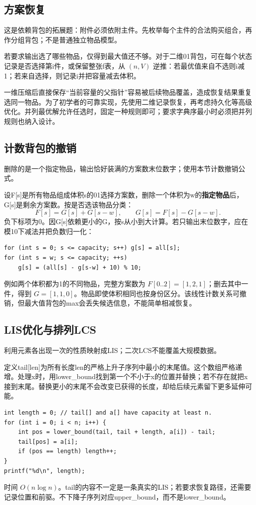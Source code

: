 \subsection{方案恢复}
这是依赖背包的拓展题：附件必须依附主件。先枚举每个主件的合法购买组合，再作分组背包；不是普通独立物品模型。

若要求输出选了哪些物品，仅得到最大值还不够。对于二维01背包，可在每个状态记录是否选择第i件，或保留整张f表，从 $(n,V)$ 逆推：若最优值来自不选则i减1；若来自选择，则记录i并把容量减去体积。

一维压缩后直接保存“当前容量的父指针”容易被后续物品覆盖，造成恢复结果重复选同一物品。为了初学者的可靠实现，先使用二维记录恢复，再考虑持久化等高级优化。并列最优解允许任选时，固定一种规则即可；要求字典序最小时必须把并列规则也纳入设计。

\subsection{计数背包的撤销}
删除的是一个指定物品，输出恰好装满的方案数末位数字；使用本节计数撤销公式。

设F[s]是所有物品组成体积s的01选择方案数，删除一个体积为w的\textbf{指定物品}后，G[s]是剩余方案数。按是否选该物品分类：
\[F[s]=G[s]+G[s-w],\qquad G[s]=F[s]-G[s-w].\]
负下标项为0。因G[s]依赖更小的G，按s从小到大计算。若只输出末位数字，应在模10下减法并把负数归一化：
\begin{lstlisting}
for (int s = 0; s <= capacity; s++) g[s] = all[s];
for (int s = w; s <= capacity; ++s)
    g[s] = (all[s] - g[s-w] + 10) % 10;
\end{lstlisting}
例如两个体积都为1的不同物品，完整方案数为 $F[0..2]=[1,2,1]$；删去其中一件，得到 $G=[1,1,0]$。物品即使体积相同也按身份区分。该线性计数关系可撤销，但最大值背包的max会丢失候选信息，不能简单相减恢复。

\subsection{LIS优化与排列LCS}
利用元素各出现一次的性质映射成LIS；二次LCS不能覆盖大规模数据。

定义tail[len]为所有长度len的严格上升子序列中最小的末尾值。这个数组严格递增。处理x时，用lower\_bound找到第一个不小于x的位置并替换；若不存在就把x接到末尾。替换更小的末尾不会改变已获得的长度，却给后续元素留下更多延伸可能。
\begin{lstlisting}
int length = 0; // tail[] and a[] have capacity at least n.
for (int i = 0; i < n; i++) {
    int pos = lower_bound(tail, tail + length, a[i]) - tail;
    tail[pos] = a[i];
    if (pos == length) length++;
}
printf("%d\n", length);
\end{lstlisting}
时间 $O(n\log n)$。tail的内容不一定是一条真实的LIS；若要求恢复路径，还需要记录位置和前驱。不下降子序列对应upper\_bound，而不是lower\_bound。

